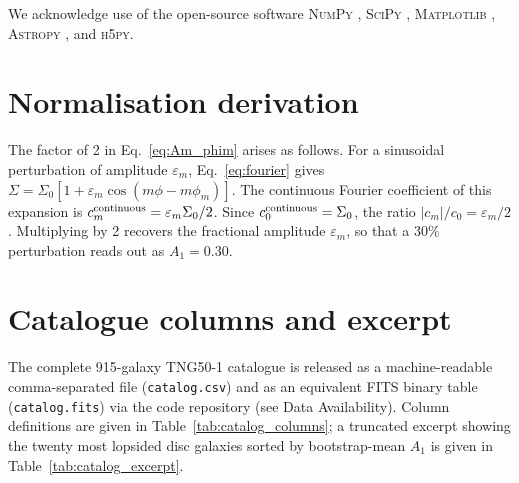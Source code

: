 \documentclass[fleqn,usenatbib]{mnras}
\newcommand{\Am}[1]{A_{#1}}
\newcommand{\Amone}{\ensuremath{\Am{1}}}
\begin{document}
We acknowledge use of the open-source software \textsc{NumPy}
\citep{2020Natur.585..357H}, \textsc{SciPy} \citep{2020NaMet..17..261V},
\textsc{Matplotlib} \citep{2007CSE.....9...90H}, \textsc{Astropy}
\citep{2022ApJ...935..167A}, and \textsc{h5py}.





\appendix

\section{Normalisation derivation}
\label{app:norm}

The factor of 2 in Eq.~\ref{eq:Am_phim} arises as follows.  For a
sinusoidal perturbation of amplitude $\varepsilon_m$,
Eq.~\ref{eq:fourier} gives
$\Sigma = \Sigma_0[1 + \varepsilon_m \cos(m\phi - m\phi_m)]$.  The
continuous Fourier coefficient of this expansion is
$c_m^{\rm continuous} = \varepsilon_m \Sigma_0 / 2$.  Since
$c_0^{\rm continuous} = \Sigma_0$, the ratio
$|c_m|/c_0 = \varepsilon_m / 2$.  Multiplying by 2 recovers the
fractional amplitude $\varepsilon_m$, so that a $30\%$ perturbation
reads out as $\Amone = 0.30$.


\section{Catalogue columns and excerpt}
\label{app:catalog_columns}

The complete 915-galaxy TNG50-1 catalogue is released as a
machine-readable comma-separated file (\texttt{catalog.csv}) and
as an equivalent FITS binary table (\texttt{catalog.fits})
via the code repository (see Data Availability).  Column
definitions are given in Table~\ref{tab:catalog_columns}; a
truncated excerpt showing the twenty most lopsided disc galaxies
sorted by bootstrap-mean $\Amone$ is given in
Table~\ref{tab:catalog_excerpt}.
\end{document}
